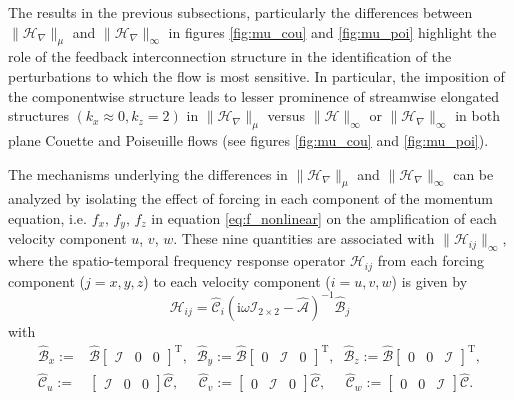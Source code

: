 The results in the previous subsections, particularly the differences between $\|\mathcal{H}_\nabla\|_\mu$ and  $\|\mathcal{H}_\nabla\|_\infty$ in figures \ref{fig:mu_cou} and \ref{fig:mu_poi} highlight the role of the feedback interconnection structure in the identification of the perturbations to which the flow is most sensitive. In particular, the imposition of the componentwise structure leads to lesser prominence of streamwise elongated structures $(k_x\approx 0, k_z=2)$ in  $\|\mathcal{H}_{\nabla}\|_{\mu}$ versus 
$\|\mathcal{H}\|_{\infty}$  or $\|\mathcal{H}_{\nabla}\|_{\infty}$ in both plane Couette and Poiseuille flows (see figures \ref{fig:mu_cou} and \ref{fig:mu_poi}).

The mechanisms underlying the differences in $\|\mathcal{H}_{\nabla}\|_{\mu}$ and $\|\mathcal{H}_{\nabla}\|_{\infty}$
can be analyzed by isolating the effect of forcing in each component of the momentum equation, i.e. $f_x,\, f_y, \, f_z$ in equation \eqref{eq:f_nonlinear} on the amplification of each velocity component $u$, $v$, $w$. These nine quantities are associated with $\|\mathcal{H}_{ij}\|_{\infty}$, where the spatio-temporal frequency response operator $\mathcal{H}_{ij}$ from each forcing component ($j=x,y,z$) to each velocity component ($i=u,v,w$) is given by \citep{Jovanovic2005}
\begin{equation}\mathcal{H}_{ij}=\widehat{\mathcal{C}}_{i}\left(\text{i}\omega \mathcal{I}_{2\times 2}-\widehat{\mathcal{A}}\right)^{-1}\widehat{\mathcal{B}}_{j}\end{equation}
with 
\begingroup
\allowdisplaybreaks
\begin{subequations}
\label{eq:H_componentwise}
\begin{align}
     \mathcal{\widehat{B}}_x:=&\mathcal{\widehat{B}}\begin{bmatrix}
    \mathcal{I} & 0 & 0
    \end{bmatrix}^{\text{T}},   \;\; \mathcal{\widehat{B}}_y:=\mathcal{\widehat{B}}\begin{bmatrix}
    0 & \mathcal{I} & 0
    \end{bmatrix}^{\text{T}},\;\;\mathcal{\widehat{B}}_z:=\mathcal{\widehat{B}}\begin{bmatrix}
    0 & 0 & \mathcal{I}
    \end{bmatrix}^{\text{T}},\\ \mathcal{\widehat{C}}_u:=&\begin{bmatrix}\mathcal{I} & 0 & 0
    \end{bmatrix}   \mathcal{\widehat{C}} ,\;\;\;\;\;\mathcal{\widehat{C}}_v:=\begin{bmatrix}0 & \mathcal{I} & 0
    \end{bmatrix}   \mathcal{\widehat{C}},
    \;\;\;\;\;\mathcal{\widehat{C}}_w:=\begin{bmatrix}0 & 0 & \mathcal{I}
    \end{bmatrix}   \mathcal{\widehat{C}}.
\end{align}
\end{subequations}
\endgroup



